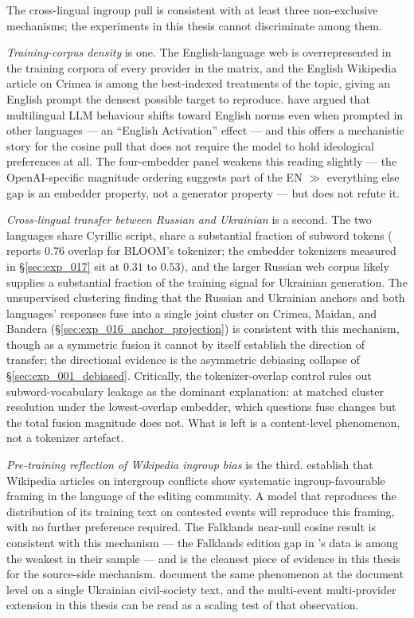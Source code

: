 The cross-lingual ingroup pull is consistent with at least three
non-exclusive mechanisms; the experiments in this thesis cannot
discriminate among them.

\emph{Training-corpus density} is one. The English-language web is
overrepresented in the training corpora of every provider in the
matrix, and the English Wikipedia article on Crimea is among the
best-indexed treatments of the topic, giving an English prompt the
densest possible target to reproduce.
\citet{zhao2025makieval} have argued that multilingual LLM behaviour
shifts toward English norms even when prompted in other languages ---
an ``English Activation'' effect --- and this offers a mechanistic
story for the cosine pull that does not require the model to hold
ideological preferences at all. The four-embedder panel weakens this
reading slightly --- the OpenAI-specific magnitude ordering suggests
part of the EN ${\gg}$ everything else gap is an embedder property,
not a generator property --- but does not refute it.

\emph{Cross-lingual transfer between Russian and Ukrainian} is a
second. The two languages share Cyrillic script, share a substantial
fraction of subword tokens (\citet{qi2023crosslingual} reports
$0.76$ overlap for BLOOM's tokenizer; the embedder tokenizers
measured in \S\ref{sec:exp_017} sit at $0.31$ to $0.53$), and the
larger Russian web corpus likely supplies a substantial fraction of
the training signal for Ukrainian generation. The unsupervised
clustering finding that the Russian and Ukrainian anchors and both
languages' responses fuse into a single joint cluster on Crimea,
Maidan, and Bandera (\S\ref{sec:exp_016_anchor_projection}) is
consistent with this mechanism, though as a symmetric fusion it
cannot by itself establish the direction of transfer; the
directional evidence is the asymmetric debiasing collapse of
\S\ref{sec:exp_001_debiased}. Critically, the tokenizer-overlap
control rules out subword-vocabulary leakage as the dominant
explanation: at matched cluster resolution under the
lowest-overlap embedder, which questions fuse changes but the total
fusion magnitude does not. What is left is a content-level
phenomenon, not a tokenizer artefact.

\emph{Pre-training reflection of Wikipedia ingroup bias} is the
third. \citet{oeberst2020wikipedia} establish that Wikipedia
articles on intergroup conflicts show systematic ingroup-favourable
framing in the language of the editing community. A model that
reproduces the distribution of its training text on contested events
will reproduce this framing, with no further preference required.
The Falklands near-null cosine result is consistent with this
mechanism --- the Falklands edition gap in
\citet{oeberst2020wikipedia}'s data is among the weakest in their
sample --- and is the cleanest piece of evidence in this thesis for
the source-side mechanism. \citet{smirnov2026language} document the
same phenomenon at the document level on a single Ukrainian
civil-society text, and the multi-event multi-provider extension in
this thesis can be read as a scaling test of that observation.

